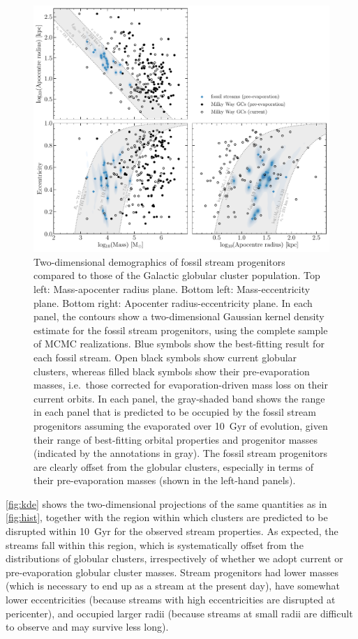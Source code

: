 \documentclass[twocolumn]{aastex63}
\begin{document}
\begin{figure}
\includegraphics[width=\hsize]{distributions_2d_mc.pdf}%
\caption{
\label{fig:kde}
Two-dimensional demographics of fossil stream progenitors compared to those of the Galactic globular cluster population.
Top left: Mass-apocenter radius plane. Bottom left: Mass-eccentricity plane. Bottom right: Apocenter radius-eccentricity plane.
In each panel, the contours show a two-dimensional Gaussian kernel density estimate for the fossil stream progenitors, using the complete sample of MCMC realizations. 
Blue symbols show the best-fitting result for each fossil stream.
Open black symbols show current globular clusters, whereas filled black symbols show their pre-evaporation masses, i.e.\ those corrected for evaporation-driven mass loss on their current orbits.
In each panel, the gray-shaded band shows the range in each panel that is predicted to be occupied by the fossil stream progenitors assuming the evaporated over 10~Gyr of evolution, given their range of best-fitting orbital properties and progenitor masses (indicated by the annotations in gray).
The fossil stream progenitors are clearly offset from the globular clusters, especially in terms of their pre-evaporation masses (shown in the left-hand panels).}
\end{figure}

\autoref{fig:kde} shows the two-dimensional projections of the same quantities as in \autoref{fig:hist}, together with the region within which clusters are predicted to be disrupted within 10~Gyr for the observed stream properties.
As expected, the streams fall within this region, which is systematically offset from the distributions of globular clusters, irrespectively of whether we adopt current or pre-evaporation globular cluster masses.
Stream progenitors had lower masses (which is necessary to end up as a stream at the present day), have somewhat lower eccentricities (because streams with high eccentricities are disrupted at pericenter), and occupied larger radii (because streams at small radii are difficult to observe and may survive less long).
\end{document}
